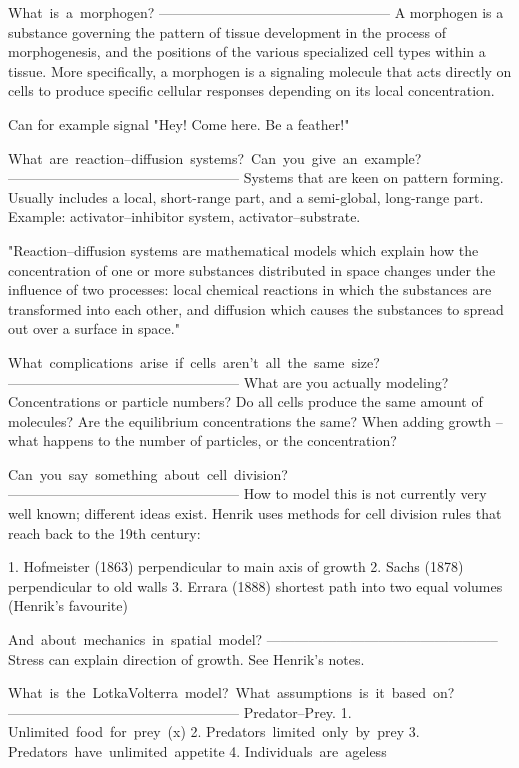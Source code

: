 What is a morphogen?
--------------------------------------------------
A morphogen is a substance governing the pattern of tissue development in the
process of morphogenesis, and the positions of the various specialized cell
types within a tissue. More specifically, a morphogen is a signaling molecule
that acts directly on cells to produce specific cellular responses depending on
its local concentration.

Can for example signal "Hey! Come here. Be a feather!"

What are reaction--diffusion systems? Can you give an example?
--------------------------------------------------
Systems that are keen on pattern forming. Usually includes a local, short-range part,
and a semi-global, long-range part. Example: activator--inhibitor system,
activator--substrate.

"Reaction–diffusion systems are mathematical models which explain how the
concentration of one or more substances distributed in space changes under the
influence of two processes: local chemical reactions in which the substances are
transformed into each other, and diffusion which causes the substances to spread
out over a surface in space."

What complications arise if cells aren’t all the same size?
--------------------------------------------------
What are you actually modeling? Concentrations or particle numbers? 
Do all cells produce the same amount of molecules? Are the equilibrium
concentrations the same? When adding growth -- what happens to the number of
particles, or the concentration?  

Can you say something about cell division?
--------------------------------------------------
How to model this is not currently very well known; different ideas exist.
Henrik uses methods for cell division rules that reach back to the 19th 
century:   

1. Hofmeister (1863) perpendicular to main axis of growth
2. Sachs (1878) perpendicular to old walls
3. Errara (1888) shortest path into two equal volumes (Henrik's favourite) 

And about mechanics in spatial model?
--------------------------------------------------
Stress can explain direction of growth. See Henrik's notes.  

What is the Lotka­Volterra model? What assumptions is it based on?
--------------------------------------------------
Predator--Prey.
1. Unlimited food for prey (x)
2. Predators limited only by prey
3. Predators have unlimited appetite
4. Individuals are ageless 


